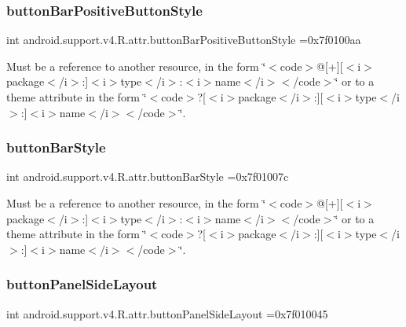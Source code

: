 \subsubsection{\texorpdfstring{button\+Bar\+Positive\+Button\+Style}{buttonBarPositiveButtonStyle}}
{\footnotesize\ttfamily int android.\+support.\+v4.\+R.\+attr.\+button\+Bar\+Positive\+Button\+Style =0x7f0100aa\hspace{0.3cm}{\ttfamily [static]}}

Must be a reference to another resource, in the form \char`\"{}$<$code$>$@\mbox{[}+\mbox{]}\mbox{[}$<$i$>$package$<$/i$>$\+:\mbox{]}$<$i$>$type$<$/i$>$\+:$<$i$>$name$<$/i$>$$<$/code$>$\char`\"{} or to a theme attribute in the form \char`\"{}$<$code$>$?\mbox{[}$<$i$>$package$<$/i$>$\+:\mbox{]}\mbox{[}$<$i$>$type$<$/i$>$\+:\mbox{]}$<$i$>$name$<$/i$>$$<$/code$>$\char`\"{}. \mbox{\label{classandroid_1_1support_1_1v4_1_1R_1_1attr_ab6043a58f9feddd5e50a5dff20e3c18c}} 
\subsubsection{\texorpdfstring{button\+Bar\+Style}{buttonBarStyle}}
{\footnotesize\ttfamily int android.\+support.\+v4.\+R.\+attr.\+button\+Bar\+Style =0x7f01007c\hspace{0.3cm}{\ttfamily [static]}}

Must be a reference to another resource, in the form \char`\"{}$<$code$>$@\mbox{[}+\mbox{]}\mbox{[}$<$i$>$package$<$/i$>$\+:\mbox{]}$<$i$>$type$<$/i$>$\+:$<$i$>$name$<$/i$>$$<$/code$>$\char`\"{} or to a theme attribute in the form \char`\"{}$<$code$>$?\mbox{[}$<$i$>$package$<$/i$>$\+:\mbox{]}\mbox{[}$<$i$>$type$<$/i$>$\+:\mbox{]}$<$i$>$name$<$/i$>$$<$/code$>$\char`\"{}. \mbox{\label{classandroid_1_1support_1_1v4_1_1R_1_1attr_a7307a34f07a4a79b917e25e56bc4047d}} 
\subsubsection{\texorpdfstring{button\+Panel\+Side\+Layout}{buttonPanelSideLayout}}
{\footnotesize\ttfamily int android.\+support.\+v4.\+R.\+attr.\+button\+Panel\+Side\+Layout =0x7f010045\hspace{0.3cm}{\ttfamily [static]}}


